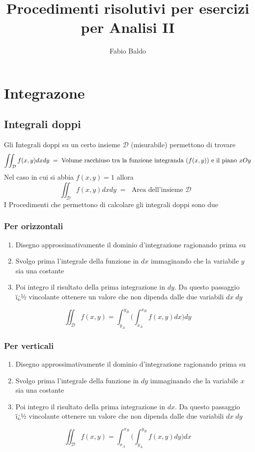 \documentclass[10pt,a4paper]{report}
\author{Fabio Baldo}
\title{Procedimenti risolutivi per esercizi per Analisi II}
\begin{document}
	\section*{Integrazone}
	
		\subsection*{Integrali doppi}
			Gli Integrali doppi su un certo insieme $ \mathcal{D} $ (misurabile) permettono di trovare
			\[ \iint_{\mathcal{D}} f(x,y)dxdy \; = \; \text{Volume racchiuso tra la funzione integranda ($ f(x,y) $) e il piano $ xOy $} \]
			Nel caso in cui si abbia $ f(x,y) = 1 $ allora 
			\[ \iint_{\mathcal{D}} f(x,y) dxdy \; = \; \text{ Area dell'insieme $\mathcal{D}$  }\]
			I Procedimenti che permettono di calcolare gli integrali doppi sono due
				\subsubsection{Per orizzontali}
				\begin{enumerate}
					\item Disegno approssimativamente il dominio d'integrazione ragionando prima su 
					\item Svolgo prima l'integrale della funzione in $ dx $ immaginando che la variabile $ y $ sia una costante 
					\item Poi integro il risultato della prima integrazione in $ dy $. Da questo passaggio ï¿½ vincolante ottenere un valore che non dipenda dalle due variabili $ dx \; dy $
				\end{enumerate}
				\[ \iint_{\mathcal{D}} f(x,y) = \int_{y_{A}}^{y_{B}} \Big(\int_{x_{A}}^{x_{B}}f(x,y) dx\Big) dy \]
				\subsubsection{Per verticali}
				\begin{enumerate}
					\item Disegno approssimativamente il dominio d'integrazione ragionando prima su 
					\item Svolgo prima l'integrale della funzione in $ dy $ immaginando che la variabile $ x $ sia una costante 
					\item Poi integro il risultato della prima integrazione in $ dx $. Da questo passaggio ï¿½ vincolante ottenere un valore che non dipenda dalle due variabili $ dx \; dy $
				\end{enumerate}
				\[ \iint_{\mathcal{D}} f(x,y) = \int_{x_{A}}^{x_{B}} \Big(\int_{y_{A}}^{y_{B}}f(x,y) dy\Big) dx \]
				
\end{document}
